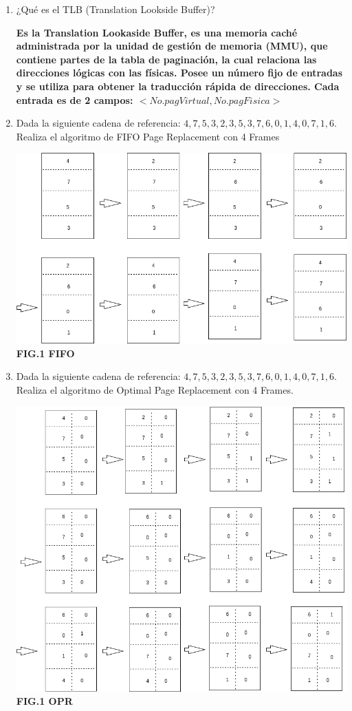 \documentclass[12pt]{article}
\begin{document}
\begin{enumerate}
    \item ¿Qué es el TLB (Translation Lookside Buffer)?
    \vspace{2mm}
    
    \textbf{Es la Translation Lookaside Buffer, es una memoria caché administrada por la unidad de gestión de memoria (MMU), que contiene partes de la tabla de paginación, la cual relaciona las direcciones lógicas con las físicas. Posee un número fijo de entradas y se utiliza para obtener la traducción rápida de direcciones.
    Cada entrada es de 2 campos: $<No.pagVirtual, No.pagFisica>$}

    \item Dada la siguiente cadena de referencia: $4,7,5,3,2,3,5,3,7,6,0,1,4,0,7,1,6.$ Realiza el algoritmo de FIFO Page Replacement con 4 Frames
    \vspace{2mm}
    
    \textbf{\includegraphics[scale = 0.40]{images/fifo.png} FIG.1 \textbf{FIFO}}

    \item Dada la siguiente cadena de referencia: $4,7,5,3,2,3,5,3,7,6,0,1,4,0,7,1,6.$ Realiza el algoritmo de Optimal Page Replacement con 4 Frames.
    \vspace{2mm}
    
    \textbf{\textbf{\includegraphics[scale = 0.40]{images/opr.png} FIG.1 \textbf{OPR}}}

\end{enumerate}
\end{document}
